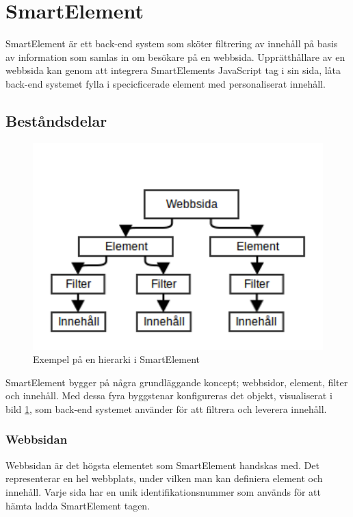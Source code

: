 \section{SmartElement}

SmartElement är ett back-end system som sköter filtrering av innehåll på basis av information som samlas in om besökare på en webbsida. Upprätthållare av en webbsida kan genom att integrera SmartElements JavaScript tag i sin sida, låta back-end systemet fylla i specicficerade element med personaliserat innehåll.

\subsection{Beståndsdelar}

\begin{figure}[h!]
\centering
\includegraphics[width=120mm]{assets/images/smelementdatamodelabstract.png}
\caption{Exempel på en hierarki i SmartElement}
\label{abstractstructure}
\end{figure}

SmartElement bygger på några grundläggande koncept; webbsidor, element, filter och innehåll. Med dessa fyra byggstenar konfigureras det objekt, visualiserat i bild \ref{abstractstructure}, som back-end systemet använder för att filtrera och leverera innehåll.

\subsubsection{Webbsidan}

Webbsidan är det högsta elementet som SmartElement handskas med. Det representerar en hel webbplats, under vilken man kan definiera element och innehåll. Varje sida har en unik identifikationsnummer som används för att hämta ladda SmartElement tagen.

